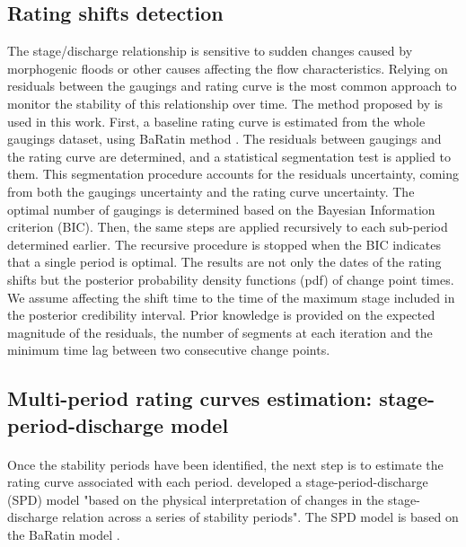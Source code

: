 \documentclass[11pt]{article}
\begin{document}
     \subsection{Rating shifts detection}
    
    The stage/discharge relationship is sensitive to sudden changes caused by morphogenic floods or other causes affecting the flow characteristics. Relying on residuals between the gaugings and rating curve is the most common approach to monitor the stability of this relationship over time. The method proposed by \citet{darienzo_detection_2021} is used in this work. First, a baseline rating curve is estimated from the whole gaugings dataset, using BaRatin method \citep{le_coz_combining_2014}. The residuals between gaugings and the rating curve are determined, and a statistical segmentation test is applied to them. This segmentation procedure accounts for the residuals uncertainty, coming from both the gaugings uncertainty and the rating curve uncertainty. The optimal number of gaugings is determined based on the Bayesian Information criterion (BIC). Then, the same steps are applied recursively to each sub-period determined earlier. The recursive procedure is stopped when the BIC indicates that a single period is optimal. The results are not only the dates of the rating shifts but the posterior probability density functions (pdf) of change point times. We assume affecting the shift time to the time of the maximum stage included in the posterior credibility interval. Prior knowledge is provided on the expected magnitude of the residuals, the number of segments at each iteration and the minimum time lag between two consecutive change points.
    
    \subsection{Multi-period rating curves estimation: stage-period-discharge model}

    \paragraph{}
    Once the stability periods have been identified, the next step is to estimate the rating curve associated with each period. \citet{mansanarez_shift_2019} developed a stage-period-discharge (SPD) model "based on the physical interpretation of changes in the stage-discharge relation across a series of stability periods". The SPD model is based on the BaRatin model \citep{le_coz_combining_2014}.
\end{document}
